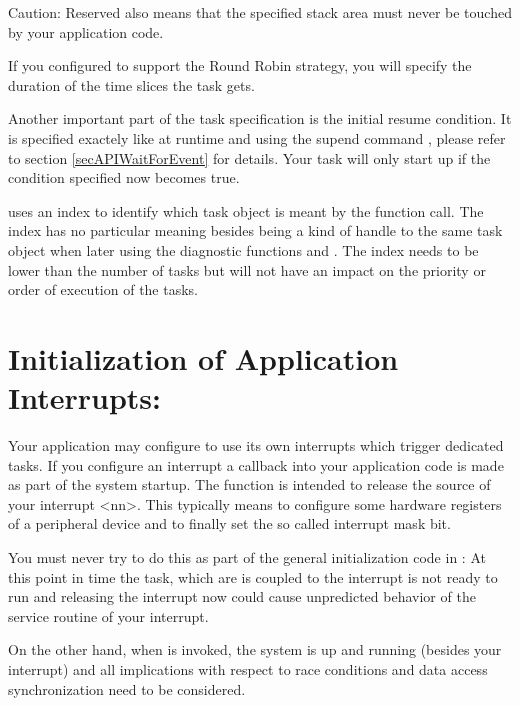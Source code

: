 Caution: Reserved also means that the specified stack area must never be
touched by your application code.

If you configured \rtos{} to support the Round Robin strategy, you will
specify the duration of the time slices the task gets.

Another important part of the task specification is the initial resume
condition. It is specified exactely like at runtime and using the supend
command , please refer to section
\ref{secAPIWaitForEvent} for details. Your task will only start up if the
condition specified now becomes true.

 uses an index to identify which task object is
meant by the function call. The index has no particular meaning besides
being a kind of handle to the same task object when later using the
diagnostic functions  and
. The index needs to be lower than the number
of tasks but will not have an impact on the priority or order of execution
of the tasks.


\section{Initialization of Application Interrupts:
}

Your application may configure \rtos{} to use its own interrupts which
trigger dedicated tasks. If you configure an interrupt a callback into
your application code is made as part of the system startup. The function
 is intended to
release the source of your interrupt \textless nn\textgreater. This
typically means to configure some hardware registers of a peripheral
device and to finally set the so called interrupt mask bit.

You must never try to do this as part of the general initialization
code in : At this point in time the task, which are is
coupled to the interrupt is not ready to run and releasing the interrupt
now could cause unpredicted behavior of the service routine of your
interrupt.  

On the other hand, when  is invoked, the \rtos{} system is up and running (besides
your interrupt) and all implications with respect to race conditions and
data access synchronization need to be considered.


